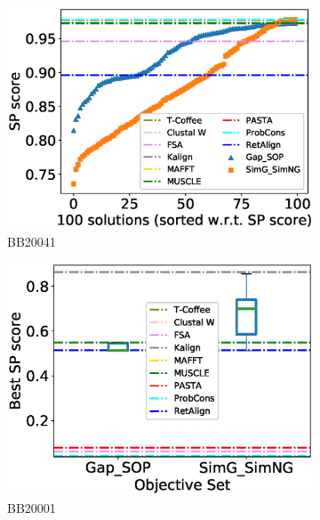 \begin{figure}[!htbp]
\begin{adjustwidth}{-1.5cm}{-1cm}
\begin{subfigure}{0.22\textwidth}
			\includegraphics[width=\columnwidth]{Figure/summary/precomputedInit/Balibase/BB20041_pairs_density_single_run_2}
			\caption{BB20041}
		\end{subfigure}
		\begin{subfigure}{0.22\textwidth}
			\includegraphics[width=\columnwidth]{Figure/summary/precomputedInit/Balibase/BB20001_objset_pairs_rank_2}
			\caption{BB20001}
		\end{subfigure}	
		\begin{subfigure}{0.22\textwidth}

\end{subfigure}
\end{adjustwidth}
\end{figure}
